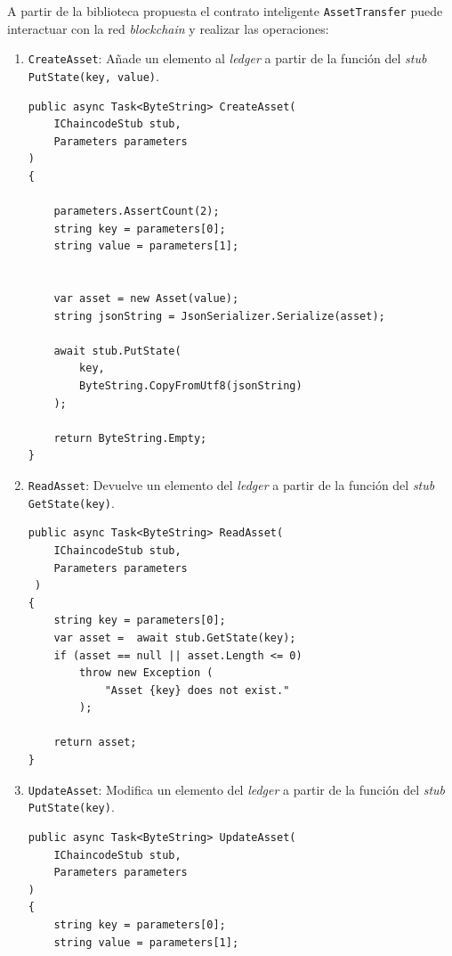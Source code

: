 A partir de la biblioteca propuesta el contrato inteligente \texttt{AssetTransfer} puede interactuar con la red \textit{blockchain} y realizar las operaciones: 

\begin{enumerate}
\item \texttt{CreateAsset}: Añade un elemento al \textit{ledger} a partir de la función del \textit{stub} \texttt{PutState(key, value)}.\\

\begin{lstlisting}[caption={Función \texttt{CreateAsset(...)}}]
public async Task<ByteString> CreateAsset(
	IChaincodeStub stub,
	Parameters parameters
)
{

    parameters.AssertCount(2);
    string key = parameters[0];
    string value = parameters[1];


    var asset = new Asset(value);
    string jsonString = JsonSerializer.Serialize(asset);

    await stub.PutState(
    	key,
    	ByteString.CopyFromUtf8(jsonString)
    );
    
    return ByteString.Empty;
}
\end{lstlisting}

\item \texttt{ReadAsset}: Devuelve un elemento del \textit{ledger} a partir de la función del \textit{stub} \texttt{GetState(key)}.\\

\begin{lstlisting}[caption={Función \texttt{ReadAsset(...)}}]
 public async Task<ByteString> ReadAsset(
 	IChaincodeStub stub,
 	Parameters parameters
 )
{
    string key = parameters[0];
    var asset =  await stub.GetState(key);
    if (asset == null || asset.Length <= 0) 
    	throw new Exception (
    		"Asset {key} does not exist."
    	);

    return asset;
}
\end{lstlisting}

\item \texttt{UpdateAsset}: Modifica un elemento del \textit{ledger} a partir de la función del \textit{stub}\texttt{ PutState(key)}.\\

\begin{lstlisting}[caption={Función \texttt{UpdateAsset(...)}}]
public async Task<ByteString> UpdateAsset(
	IChaincodeStub stub,
	Parameters parameters
)
{
    string key = parameters[0];
    string value = parameters[1];


\end{lstlisting}
\end{enumerate}
